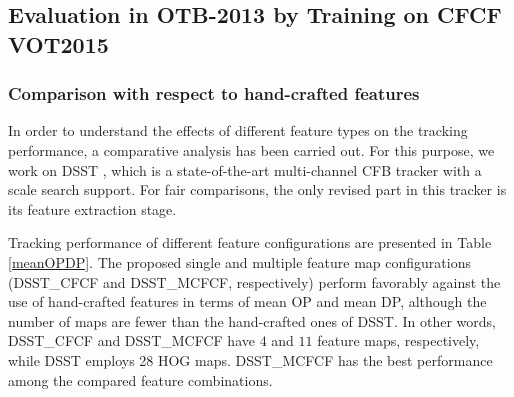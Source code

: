\documentclass[journal]{IEEEtran}
\begin{document}
\subsection{Evaluation in OTB-2013 by Training on CFCF VOT2015}
\subsubsection{Comparison with respect to hand-crafted features}
In order to understand the effects of different feature types on the tracking performance, a comparative analysis has been carried out. For this purpose, we work on DSST \cite{DSST}, which is a state-of-the-art multi-channel CFB tracker with a scale search support. For fair comparisons, the only revised part in this tracker is its feature extraction stage.
\begin{table*}
\caption{\label{meanOPDP}\small Analysis on feature type and quantity. \textbf{Raw}: raw image intensities, \textbf{X Grad}: magnitude of the horizontal gradient, \textbf{Y Grad}: magnitude of the vertical gradient, \textbf{CFCF}: learned single feature, \textbf{MCFCF}: learned multiple features. \textbf{Mean OP}: average overlap score with the threshold 0.5, \textbf{Mean DP}: average center location error with the threshold $20$ pixels.}
\normalsize
{}
\end{table*}
Tracking performance of different feature configurations are presented in Table \ref{meanOPDP}. The proposed single and multiple feature map configurations (DSST\_CFCF and DSST\_MCFCF, respectively) perform favorably against the use of hand-crafted features in terms of mean OP and mean DP, although the number of maps are fewer than the hand-crafted ones of DSST. In other words, DSST\_CFCF and DSST\_MCFCF have $4$ and $11$ feature maps, respectively, while DSST employs 28 HOG maps. DSST\_MCFCF has the best performance among the compared feature combinations.
\end{document}
